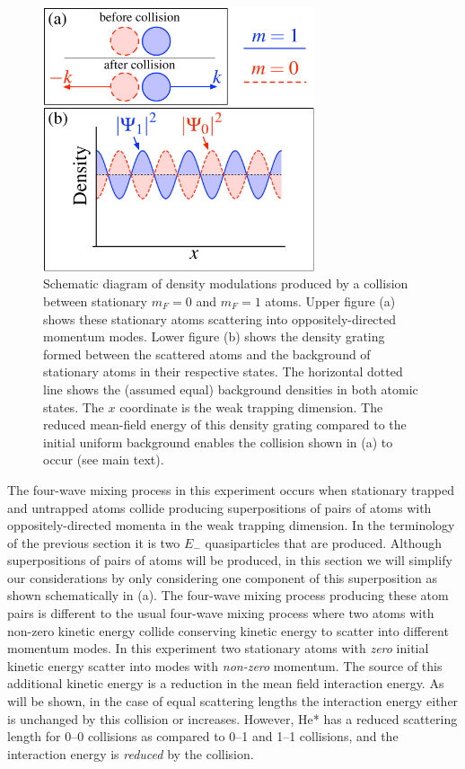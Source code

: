 \begin{figure}
    \begin{center}
        \includegraphics[width=8cm]{CollisionDiagram}
        \caption{Schematic diagram of density modulations produced by a collision
                 between stationary $m_F=0$ and $m_F=1$ atoms. Upper figure (a)
                 shows these stationary atoms scattering into oppositely-directed
                 momentum modes. Lower figure (b) shows the density grating formed
                 between the scattered atoms and the background of stationary atoms
                 in their respective states. The horizontal dotted line shows the
                 (assumed equal) background densities in both atomic states. The $x$
                 coordinate is the weak trapping dimension. The reduced mean-field
                 energy of this density grating compared to the initial uniform
                 background enables the collision shown in (a) to occur (see main
                 text).
                 \label{Peaks:CollisionDiagram}}
    \end{center}
\end{figure}

The four-wave mixing process in this experiment occurs when stationary trapped and untrapped atoms collide producing superpositions of pairs of atoms with oppositely-directed momenta in the weak trapping dimension. In the terminology of the previous section it is two $E_-$ quasiparticles that are produced. Although superpositions of pairs of atoms will be produced, in this section we will simplify our considerations by only considering one component of this superposition as shown schematically in (a). The four-wave mixing process producing these atom pairs is different to the usual four-wave mixing process where two atoms with non-zero kinetic energy collide conserving kinetic energy to scatter into different momentum modes. In this experiment two stationary atoms with \emph{zero} initial kinetic energy scatter into modes with \emph{non-zero} momentum. The source of this additional kinetic energy is  a reduction in the mean field interaction energy. As will be shown, in the case of equal scattering lengths the interaction energy either is unchanged by this collision or increases. However, He* has a reduced scattering length for 0--0 collisions as compared to 0--1 and 1--1 collisions, and the interaction energy is \emph{reduced} by the collision.

